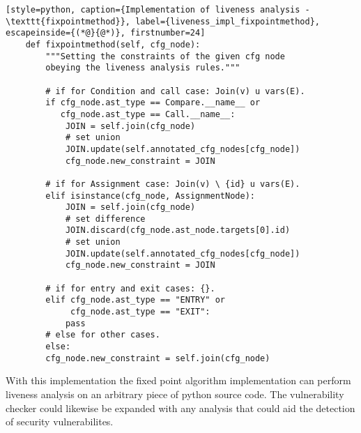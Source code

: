 \begin{lstlisting}[style=python, caption={Implementation of liveness analysis - \texttt{fixpointmethod}}, label={liveness_impl_fixpointmethod}, escapeinside={(*@}{@*)}, firstnumber=24]
    def fixpointmethod(self, cfg_node):
        """Setting the constraints of the given cfg node
        obeying the liveness analysis rules."""
    
        # if for Condition and call case: Join(v) u vars(E).
        if cfg_node.ast_type == Compare.__name__ or
           cfg_node.ast_type == Call.__name__:
            JOIN = self.join(cfg_node)
            # set union
            JOIN.update(self.annotated_cfg_nodes[cfg_node])  
            cfg_node.new_constraint = JOIN

        # if for Assignment case: Join(v) \ {id} u vars(E).
        elif isinstance(cfg_node, AssignmentNode): 
            JOIN = self.join(cfg_node)
            # set difference
            JOIN.discard(cfg_node.ast_node.targets[0].id)
            # set union
            JOIN.update(self.annotated_cfg_nodes[cfg_node])  
            cfg_node.new_constraint = JOIN

        # if for entry and exit cases: {}.
        elif cfg_node.ast_type == "ENTRY" or
             cfg_node.ast_type == "EXIT":
            pass
        # else for other cases.
        else:
        cfg_node.new_constraint = self.join(cfg_node)
\end{lstlisting}

With this implementation the \pyt{} fixed point algorithm implementation can perform liveness analysis on an arbitrary piece of python source code.
The \pyt{} vulnerability checker could likewise be expanded with any analysis that could aid the detection of security vulnerabilites.

